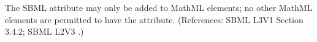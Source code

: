 The SBML attribute  may only be added to MathML 
elements; no other MathML elements are permitted to have the 
attribute.  (References: SBML L3V1 Section 3.4.2; SBML L2V3 .)
